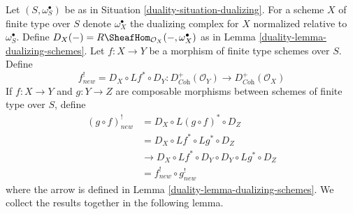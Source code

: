 Let $(S, \omega_S^\bullet)$ be as in Situation \ref{duality-situation-dualizing}.
For a scheme $X$ of finite type over $S$ denote $\omega_X^\bullet$ the
dualizing complex for $X$ normalized relative to $\omega_S^\bullet$.
Define $D_X(-) = R\SheafHom_{\mathcal{O}_X}(-, \omega_X^\bullet)$
as in Lemma \ref{duality-lemma-dualizing-schemes}.
Let $f : X \to Y$ be a morphism of finite type schemes over $S$.
Define
$$
f_{new}^! = D_X \circ Lf^* \circ D_Y :
D_{\textit{Coh}}^+(\mathcal{O}_Y)
\to
D_{\textit{Coh}}^+(\mathcal{O}_X)
$$
If $f : X \to Y$ and $g : Y \to Z$ are composable
morphisms between schemes of finite type over $S$, define
\begin{align*}
(g \circ f)^!_{new} & = D_X \circ L(g \circ f)^* \circ D_Z \\
& = D_X \circ Lf^* \circ Lg^* \circ D_Z \\
& \to D_X \circ Lf^* \circ D_Y \circ D_Y \circ Lg^* \circ D_Z \\
& = f^!_{new} \circ g^!_{new}
\end{align*}
where the arrow is defined in Lemma \ref{duality-lemma-dualizing-schemes}.
We collect the results together in the following lemma.

